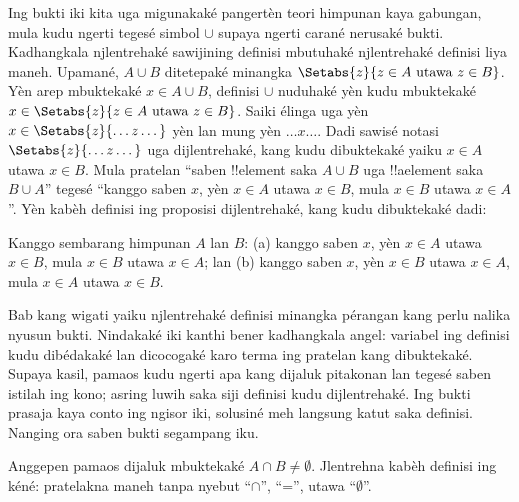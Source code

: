 \documentclass[../../../include/open-logic-section]{subfiles}
\begin{document}
Ing bukti iki kita uga migunakaké pangertèn teori himpunan kaya
gabungan, mula kudu ngerti tegesé simbol $\cup$ supaya ngerti
carané nerusaké bukti. Kadhangkala njlentrehaké sawijining
definisi mbutuhaké njlentrehaké definisi liya maneh. Upamané,
$A \cup B$ ditetepaké minangka $\Setabs{z}{z \in A
  \text{ utawa } z \in B}$. Yèn arep mbuktekaké $x \in A \cup
B$, definisi $\cup$ nuduhaké yèn kudu mbuktekaké
$x \in \Setabs{z}{z \in A \text{ utawa } z \in B}$.
Saiki élinga uga yèn $x \in \Setabs{z}{\dots z\dots}$ yèn lan
mung yèn $\dots x\dots$. Dadi sawisé notasi
$\Setabs{z}{\dots z \dots}$ uga dijlentrehaké, kang kudu
dibuktekaké yaiku $x \in A$ utawa $x \in B$. Mula pratelan
``saben !!{element} saka $A \cup B$ uga !!a{element} saka
$B \cup A$'' tegesé ``kanggo saben $x$, yèn $x \in A$
utawa $x \in B$, mula $x \in B$ utawa $x \in A$''.
Yèn kabèh definisi ing proposisi dijlentrehaké, kang kudu
dibuktekaké dadi:

\begin{prop}
Kanggo sembarang himpunan $A$ lan $B$: (a) kanggo saben $x$,
yèn $x \in A$ utawa $x \in B$, mula $x \in B$ utawa $x \in A$;
lan (b) kanggo saben $x$, yèn $x \in B$ utawa $x \in A$,
mula $x \in A$ utawa $x \in B$.
\end{prop}

Bab kang wigati yaiku njlentrehaké definisi minangka pérangan
kang perlu nalika nyusun bukti. Nindakaké iki kanthi bener
kadhangkala angel: variabel ing definisi kudu dibédakaké lan
dicocogaké karo terma ing pratelan kang dibuktekaké. Supaya
kasil, pamaos kudu ngerti apa kang dijaluk pitakonan lan
tegesé saben istilah ing kono; asring luwih saka siji definisi
kudu dijlentrehaké. Ing bukti prasaja kaya conto ing ngisor iki,
solusiné meh langsung katut saka definisi. Nanging ora saben
bukti segampang iku.

\begin{prob}
Anggepen pamaos dijaluk mbuktekaké $A \cap B \neq \emptyset$.
Jlentrehna kabèh definisi ing kéné: pratelakna maneh tanpa
nyebut ``$\cap$'', ``='', utawa ``$\emptyset$''.
\end{prob}
\end{document}
